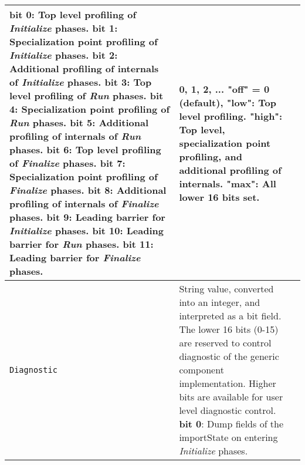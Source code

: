 \begin{longtable}{|p{}|p{}|p{}|}
                       {\bf bit 0}: Top level profiling of {\em Initialize} phases.\newline
                       {\bf bit 1}: Specialization point profiling of {\em Initialize} phases.\newline
                       {\bf bit 2}: Additional profiling of internals of {\em Initialize} phases.\newline
                       {\bf bit 3}: Top level profiling of {\em Run} phases.\newline
                       {\bf bit 4}: Specialization point profiling of {\em Run} phases.\newline
                       {\bf bit 5}: Additional profiling of internals of {\em Run} phases.\newline
                       {\bf bit 6}: Top level profiling of {\em Finalize} phases.\newline
                       {\bf bit 7}: Specialization point profiling of {\em Finalize} phases.\newline
                       {\bf bit 8}: Additional profiling of internals of {\em Finalize} phases.\newline
                       {\bf bit 9}: Leading barrier for {\em Initialize} phases.\newline
                       {\bf bit 10}: Leading barrier for {\em Run} phases.\newline
                       {\bf bit 11}: Leading barrier for {\em Finalize} phases.\newline
                     & 0, 1, 2, ... \newline
                       "off" = 0 (default), \newline
                       "low": Top level profiling. \newline
                       "high": Top level, specialization point profiling, and additional profiling of internals. \newline
                       "max": All lower 16 bits set.\\ \hline
     {\tt Diagnostic} & String value, converted into an integer, and interpreted as a bit field. The lower 16 bits (0-15) are reserved to control diagnostic of the generic component implementation. Higher bits are available for user level diagnostic control. \newline
                       {\bf bit 0}: Dump fields of the importState on entering {\em Initialize} phases.\newline

\end{longtable}

